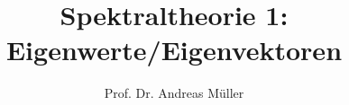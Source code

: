%
%
%


\beamertemplatenavigationsymbolsempty
\title[Spektraltheorie~1]{Spektraltheorie 1: Eigenwerte/Eigenvektoren}
\author[A.~Müller]{Prof. Dr. Andreas Müller}
\date[]{}

